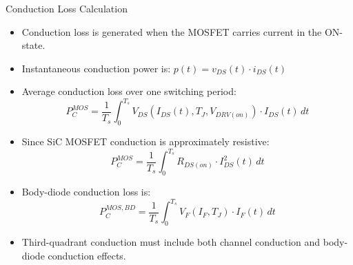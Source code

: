 \begin{frame}{Conduction Loss Calculation}
\begin{itemize}
    \item Conduction loss is generated when the MOSFET carries current in the ON-state.
    \item Instantaneous conduction power is: $p(t)=v_{DS}(t)\cdot i_{DS}(t)$
    \item Average conduction loss over one switching period:
    \[
    P_C^{MOS}
    =
    \frac{1}{T_s}
    \int_0^{T_s}
    V_{DS}(I_{DS}(t),T_J,V_{DRV(on)})
    \cdot
    I_{DS}(t)\,dt
    \]

    \item Since SiC MOSFET conduction is approximately resistive:
    \[
    P_C^{MOS}
    =
    \frac{1}{T_s}
    \int_0^{T_s}
    R_{DS(on)}
    \cdot
    I_{DS}^2(t)\,dt
    \]

    \item Body-diode conduction loss is:
    \[
    P_C^{MOS,BD}
    =
    \frac{1}{T_s}
    \int_0^{T_s}
    V_F(I_F,T_J)\cdot I_F(t)\,dt
    \]

    \item Third-quadrant conduction must include both channel conduction and body-diode conduction effects.
\end{itemize}
\end{frame}




